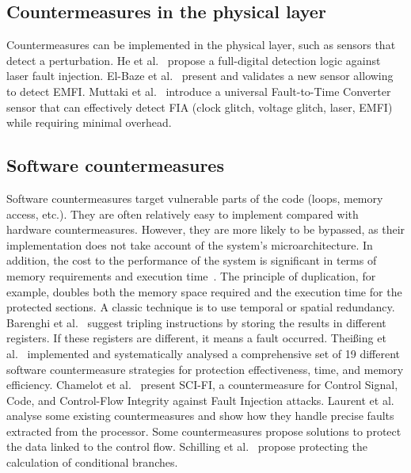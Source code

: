 \subsection{Countermeasures in the physical layer}
Countermeasures can be implemented in the physical layer, such as sensors that detect a perturbation. He et al.~\cite{HBB-16-space} propose a full-digital detection logic against laser fault injection. El-Baze et al.~\cite{ERM-16-date} present and validates a new sensor allowing to detect EMFI. Muttaki et al.~\cite{MZTF-22-host} introduce a universal Fault-to-Time Converter sensor that can effectively detect FIA (clock glitch, voltage glitch, laser, EMFI) while requiring minimal overhead.

\subsection{Software countermeasures}
Software countermeasures target vulnerable parts of the code (loops, memory access, etc.). They are often relatively easy to implement compared with hardware countermeasures. However, they are more likely to be bypassed, as their implementation does not take account of the system's microarchitecture.
In addition, the cost to the performance of the system is significant in terms of memory requirements and execution time~\cite{BCNTW-06-procieee}. The principle of duplication, for example, doubles both the memory space required and the execution time for the protected sections.
A classic technique is to use temporal or spatial redundancy. Barenghi et al.~\cite{BBKPR-10-wess} suggest tripling instructions by storing the results in different registers. If these registers are different, it means a fault occurred.
Theißing et al.~\cite{TMSSS-13-date} implemented and systematically analysed a comprehensive set of 19 different software countermeasure strategies for protection effectiveness, time, and memory efficiency.
Chamelot et al.~\cite{CCH-22-date} present SCI-FI, a countermeasure for Control Signal, Code, and Control-Flow Integrity against Fault Injection attacks.
Laurent et al.~\cite{LBDPP-19-microproc} analyse some existing countermeasures and show how they handle precise faults extracted from the processor.
Some countermeasures propose solutions to protect the data linked to the control flow. Schilling et al.~\cite{SWM-18-date} propose protecting the calculation of conditional branches.


